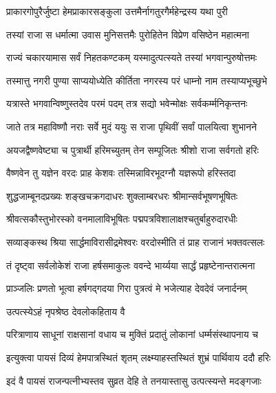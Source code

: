 \twolineshloka
{प्राकारगोपुरैर्जुष्टा हेमप्राकारसङ्कुला}
{उत्तमैर्नागतुरगैर्महेन्द्रस्य यथा पुरी}%

\twolineshloka
{तस्यां राजा स धर्मात्मा उवास मुनिसत्तमैः}
{पुरोहितेन विप्रेण वसिष्ठेन महात्मना}%

\twolineshloka
{राज्यं चकारयामास सर्वं निहतकण्टकम्}
{यस्मादुत्पत्स्यते तस्यां भगवान्पुरुषोत्तमः}%

\twolineshloka
{तस्मात्तु नगरी पुण्या साप्ययोध्येति कीर्तिता}
{नगरस्य परं धाम्नो नाम तस्याप्यभूच्छुभे}%

\twolineshloka
{यत्रास्ते भगवान्विष्णुस्तदेव परमं पदम्}
{तत्र सद्यो भवेन्मोक्षः सर्वकर्म्मनिकृन्तनः}%

\twolineshloka
{जाते तत्र महाविष्णौ नराः सर्वे मुदं ययुः}
{स राजा पृथिवीं सर्वां पालयित्वा शुभानने}%

\twolineshloka
{अयजद्वैष्णवेष्ट्या च पुत्रार्थी हरिमच्युतम्}
{तेन सम्पूजितः श्रीशो राजा सर्वगतो हरिः}%

\twolineshloka
{वैष्णवेन तु यज्ञेन वरदः प्राह केशवः}
{तस्मिन्नाविरभूदग्नौ यज्ञरूपो हरिस्तदा}%

\twolineshloka
{शुद्धजाम्बूनदप्रख्यः शङ्खचक्रगदाधरः}
{शुक्लाम्बरधरः श्रीमान्सर्वभूषणभूषितः}%

\twolineshloka
{श्रीवत्सकौस्तुभोरस्को वनमालाविभूषितः}
{पद्मपत्रविशालाक्षश्चतुर्बाहुरुदारधीः}%

\twolineshloka
{सव्याङ्कस्थ श्रिया सार्द्धमाविरासीद्रमेश्वरः}
{वरदोस्मीति तं प्राह राजानं भक्तवत्सलः}%

\twolineshloka
{तं दृष्ट्वा सर्वलोकेशं राजा हर्षसमाकुलः}
{ववन्दे भार्य्यया सार्द्धं प्रहृष्टेनान्तरात्मना}%

\twolineshloka
{प्राञ्जलिः प्रणतो भूत्वा हर्षगद्गदया गिरा}
{पुत्रत्वं मे भजेत्याह देवदेवं जनार्दनम्}%


\onelineshloka
{उत्पत्स्येऽहं नृपश्रेष्ठ देवलोकहिताय वै}%

\twolineshloka
{परित्राणाय साधूनां राक्षसानां वधाय च}
{मुक्तिं प्रदातुं लोकानां धर्म्मसंस्थापनाय च}%


\twolineshloka
{इत्युक्त्वा पायसं दिव्यं हेमपात्रस्थितं शृतम्}
{लक्ष्म्याहस्तस्थितं शुभ्रं पार्थिवाय ददौ हरिः}%


\twolineshloka
{इदं वै पायसं राजन्पत्नीभ्यस्तव सुव्रत}
{देहि ते तनयास्तासु उत्पत्स्यन्ते मदङ्गजाः}%

